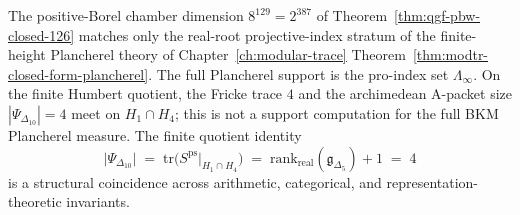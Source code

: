 \begin{remark}
\label{rem:qgf-pbw-closed-fricke}
The positive-Borel chamber dimension \(8^{129}=2^{387}\) of
Theorem~\ref{thm:qgf-pbw-closed-126} matches only the real-root
projective-index stratum of the finite-height Plancherel theory of
Chapter~\ref{ch:modular-trace}
Theorem~\ref{thm:modtr-closed-form-plancherel}. The full Plancherel
support is the pro-index set \(\Lambda_\infty\). On the finite Humbert
quotient, the Fricke trace \(4\) and the archimedean A-packet size
\(|\Psi_{\Delta_{10}}|=4\) meet on \(H_1\cap H_4\); this is not a
support computation for the full BKM Plancherel measure. The finite
quotient identity
\[
 \bigl|\Psi_{\Delta_{10}}\bigr|
 \;=\;
 \mathrm{tr}\bigl(S^{\mathrm{ps}}|_{H_1\cap H_4}\bigr)
 \;=\;
 \mathrm{rank}_{\mathrm{real}}(\mathfrak g_{\Delta_5}) + 1
 \;=\; 4
\]
is a structural coincidence across arithmetic, categorical, and
representation-theoretic invariants.
\end{remark}

